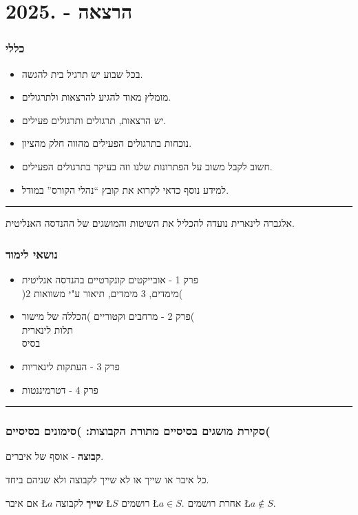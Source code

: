 \documentclass[english,hebrew]{article}
\begin{document}
\part{הרצאה {\endL} - {.2025\endL}}

\section{כללי}
\begin{itemize}
\item בכל שבוע יש תרגיל בית להגשה. 
\item מומלץ מאוד להגיע להרצאות ולתרגולים. 
\item יש הרצאות, תרגולים ותרגולים פעילים.
\item נוכחות בתרגולים הפעילים מהווה חלק מהציון. 
\item חשוב לקבל משוב על הפתרונות שלנו וזה בעיקר בתרגולים הפעילים. 
\item למידע נוסף כדאי לקרוא את קובץ \textquotedblleft נהלי הקורס\textquotedblright{}
במודל. 
\end{itemize}
\noindent\rule{1\linewidth}{1pt}

אלגברה לינארית נועדה להכליל את השיטות והמושגים של ההנדסה האנליטית.

\section{נושאי לימוד}
\begin{itemize}
\item פרק 1 - אובייקטים קונקרטיים בהנדסה אנליטית \\
 )2 מימדים, 3 מימדים, תיאור ע"י משוואות( 
\item פרק 2 - מרחבים וקטוריים )הכללה של מישור( \\
 תלות לינארית \\
 בסיס 
\item פרק 3 - העתקות לינאריות 
\item פרק 4 - דטרמיננטות 
\end{itemize}
\noindent\rule{1\linewidth}{1pt}

\section{סקירת מושגים בסיסיים מתורת הקבוצות: )סימונים בסיסיים(}

\textbf{קבוצה} - אוסף של איברים.

כל איבר או שייך או לא שייך לקבוצה ולא שניהם ביחד.

אם איבר \L{$a$} \textbf{שייך} לקבוצה \L{$S$} רושמים \L{$a\in S$}.
אחרת רושמים \L{$a\notin S$}.\\
\end{document}
